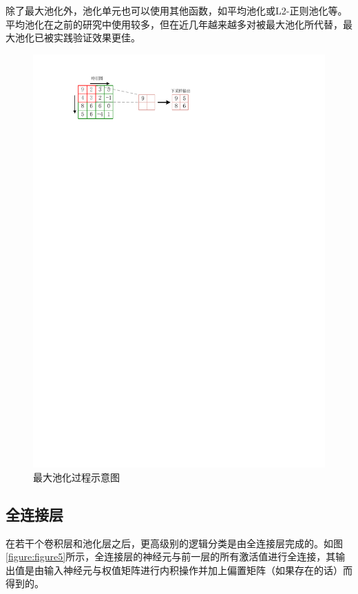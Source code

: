 除了最大池化外，池化单元也可以使用其他函数，如平均池化或L2-正则池化等。平均池化在之前的研究中使用较多，但在近几年越来越多对被最大池化所代替，最大池化已被实践验证效果更佳。

\begin{figure}[htbp]
    \begin{center}
    \includegraphics{figures/pool.pdf}
    \end{center}
    \caption{最大池化过程示意图}\label{figure:figure4}
\end{figure}

\subsection{全连接层}

在若干个卷积层和池化层之后，更高级别的逻辑分类是由全连接层完成的。如图\ref{figure:figure5}所示，全连接层的神经元与前一层的所有激活值进行全连接，其输出值是由输入神经元与权值矩阵进行内积操作并加上偏置矩阵（如果存在的话）而得到的。

